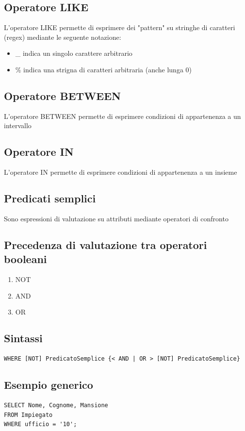 \subsection{Operatore LIKE}
L'operatore LIKE permette di esprimere dei "pattern" su stringhe di caratteri (regex) mediante le seguente notazione:
\begin{itemize}
    \item \_ indica un singolo carattere arbitrario
    \item \% indica una strigna di caratteri arbitraria (anche lunga 0)
\end{itemize}

\subsection{Operatore BETWEEN}
L'operatore BETWEEN permette di esprimere condizioni di appartenenza a un intervallo

\subsection{Operatore IN}
L'operatore IN permette di esprimere condizioni di appartenenza a un insieme

\subsection{Predicati semplici}
Sono espressioni di valutazione su attributi mediante operatori di confronto

\subsection{Precedenza di valutazione tra operatori booleani}
\begin{enumerate}
    \item NOT
    \item AND
    \item OR
\end{enumerate}

\subsection{Sintassi}
\begin{lstlisting}[language=sql_generic]
WHERE [NOT] PredicatoSemplice {< AND | OR > [NOT] PredicatoSemplice}
\end{lstlisting}

\subsection{Esempio generico}
\begin{lstlisting}[language=sql_generic]
SELECT Nome, Cognome, Mansione
FROM Impiegato
WHERE ufficio = '10';
\end{lstlisting}

